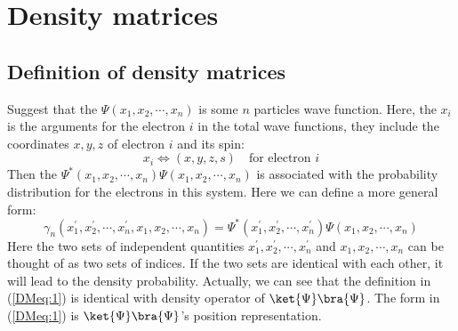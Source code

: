 \section{Density matrices}
%
%
\subsection{Definition of density matrices}
\label{DODM_in_density_matrices}
%
Suggest that the $\Psi(x_{1}, x_{2}, \cdots, x_{n})$ is some $n$
particles wave function. Here, the $x_{i}$ is the arguments for the
electron $i$ in the total wave functions, they include the
coordinates $x,y,z$ of electron $i$ and its spin:
\begin{equation}\label{}
  x_{i} \Leftrightarrow (x, y, z, s) \quad \text{for electron $i$}
\end{equation}
Then the $\Psi^{*}(x_{1}, x_{2}, \cdots, x_{n})\Psi(x_{1}, x_{2},
\cdots, x_{n})$ is associated with the probability distribution for
the electrons in this system. Here we can define a more general form:
\begin{equation}\label{DMeq:1}
  \gamma_{n}(x^{'}_{1}, x^{'}_{2}, \cdots, x^{'}_{n}, x_{1}, x_{2},
  \cdots, x_{n}) = \Psi^{*}(x^{'}_{1}, x^{'}_{2}, \cdots,
  x^{'}_{n})\Psi(x_{1}, x_{2}, \cdots, x_{n})
\end{equation}
Here the two sets of independent quantities $x^{'}_{1}, x^{'}_{2},
\cdots, x^{'}_{n}$ and $x_{1}, x_{2}, \cdots, x_{n}$ can be thought
of as two sets of indices. If the two sets are identical with each
other, it will lead to the density probability. Actually, we can see
that the definition in (\ref{DMeq:1}) is identical with density
operator of $\ket{\Psi}\bra{\Psi}$. The form in (\ref{DMeq:1}) is
$\ket{\Psi}\bra{\Psi}$'s position representation.


